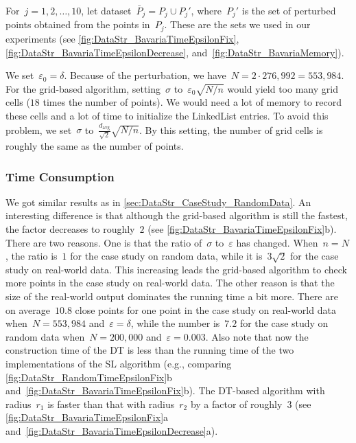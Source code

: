 For~$j=1, 2, \ldots, 10$, 
let dataset~$\bar{P}_{j}=P_{j}\cup P_{j}'$,
where~$P_{j}'$ is the set of perturbed points 
obtained from the points in~$P_{j}$. 
These are the sets we used in our experiments
(see \figs\ref{fig:DataStr_BavariaTimeEpsilonFix}, 
\ref{fig:DataStr_BavariaTimeEpsilonDecrease}, 
and~\ref{fig:DataStr_BavariaMemory}).



We set~$\varepsilon_{0}=\delta$.
Because of the perturbation,
we have~$N=2\cdot 276{,}992=553{,}984$. 
For the grid-based algorithm, 
setting~$\sigma$ to~$\varepsilon _{0}\sqrt{N/n}$ 
would yield too many grid cells 
($18$ times the number of points). 
We would need a lot of memory to record these cells 
and a lot of time to initialize the LinkedList entries. 
To avoid this problem, we set~$\sigma$ 
to~$\frac{d_\mathrm{avg}}{\sqrt{2}}\sqrt{N/n}$.
By this setting, the number of grid cells is 
roughly the same as the number of points.



\subsubsection{Time Consumption}

We got similar results as in
\sect\ref{sec:DataStr_CaseStudy_RandomData}. 
An interesting difference is that 
although the grid-based algorithm is still the fastest, 
the factor decreases to roughly~$2$
(see \fig\ref{fig:DataStr_BavariaTimeEpsilonFix}b). 
There are two reasons. 
One is that the ratio of~$\sigma$ to~$\varepsilon$ has changed. 
When~$n=N$, the ratio is~$1$ for the case study on random data,
while it is~$3\sqrt{2}$ for the case study 
on real-world data. 
This increasing leads the grid-based algorithm 
to check more points in the case study on real-world data. 
The other reason is that the size of the real-world output 
dominates the running time a bit more. 
There are on average~$10.8$ close points 
for one point in the case study on real-world data 
when~$N=553{,}984$ and~$\varepsilon =\delta$, 
while the number is~$7.2$ for the case study on random data 
when~$N=200{,}000$ and~$\varepsilon=0.003$. 
Also note that now the construction time of the DT 
is less than the running time of 
the two implementations of the SL algorithm
(e.g., comparing \figs\ref{fig:DataStr_RandomTimeEpsilonFix}b
and~\ref{fig:DataStr_BavariaTimeEpsilonFix}b). 
The DT-based algorithm with radius~$r_{1}$ is faster than 
that with radius~$r_{2}$ by a factor of roughly~$3$
(see \figs\ref{fig:DataStr_BavariaTimeEpsilonFix}a
and~\ref{fig:DataStr_BavariaTimeEpsilonDecrease}a).





